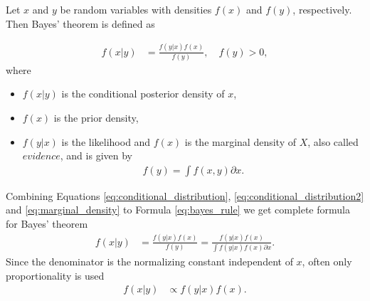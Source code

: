     \begin{definition}
    Let $x$ and $y$ be random variables with densities $f(x)$ and $f(y)$, respectively. Then Bayes' theorem is
    defined as
    \end{definition}
    \begin{align}
        f(x|y) &= \frac{f(y|x) f(x)}{f(y)}, \quad f(y) > 0,\label{eq:bayes_rule}
    \end{align}
where 
    \begin{itemize}
        \item $f(x|y) $ is the conditional posterior density of $x$,
        \item $f(x)$ is the prior density,
        \item  $f(y|x)$ is the likelihood and $f(x)$ is the marginal density of $X$, also called $evidence$, and is
        given by
            \begin{align}
            f(y) = \int f(x,y) \partial x \label{eq:marginal_density}.
            \end{align}
    \end{itemize}
    
Combining Equations \eqref{eq:conditional_distribution}, \eqref{eq:conditional_distribution2} and \eqref{eq:marginal_density} to Formula \eqref{eq:bayes_rule} we get complete formula for Bayes' theorem
    \begin{align}
        f(x|y) &= \frac{f(y|x) f(x)}{f(y)} = \frac{f(y|x) f(x)}{\int f(y|x) f(x) \partial x}. \label{eq:bayes_full}
    \end{align}
Since the denominator is the normalizing constant independent of $x$, often only proportionality is used
    \begin{align}
        f(x|y) &\propto f(y|x)f(x).
    \end{align}











    
